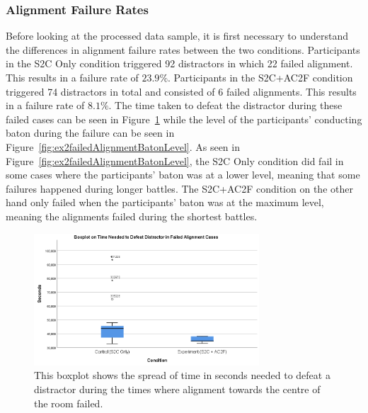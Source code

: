 \subsubsection{Alignment Failure Rates}
Before looking at the processed data sample, it is first necessary to understand the differences in alignment failure rates between the two conditions. Participants in the S2C Only condition triggered 92 distractors in which 22 failed alignment. This results in a failure rate of $23.9\%$. Participants in the S2C+AC2F condition triggered 74 distractors in total and consisted of 6 failed alignments. This results in a failure rate of $8.1\%$. The time taken to defeat the distractor during these failed cases can be seen in Figure~\ref{fig:ex2failedDistractorTimeBoxplot} while the level of the participants' conducting baton during the failure can be seen in Figure~\ref{fig:ex2failedAlignmentBatonLevel}. As seen in Figure~\ref{fig:ex2failedAlignmentBatonLevel}, the S2C Only condition did fail in some cases where the participants' baton was at a lower level, meaning that some failures happened during longer battles. The S2C+AC2F condition on the other hand only failed when the participants' baton was at the maximum level, meaning the alignments failed during the shortest battles. 

\begin{figure}[tbph]
    \centering
    \includegraphics[width=0.75\textwidth]{figures/graphs/failureDistractorDefeatTimeBoxplot.png}
    \caption[Boxplot on Time Needed to Defeat Distractor During Failed Alignments]{This boxplot shows the spread of time in seconds needed to defeat a distractor during the times where alignment towards the centre of the room failed.}
    \label{fig:ex2failedDistractorTimeBoxplot}
\end{figure}

